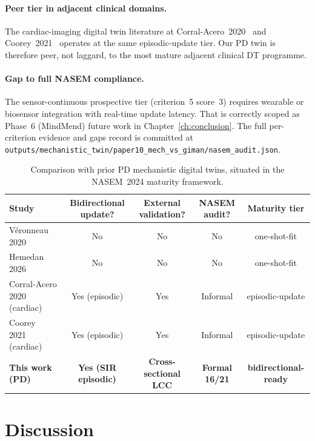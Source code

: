 \paragraph{Peer tier in adjacent clinical domains.} The cardiac-imaging digital twin literature at Corral-Acero~2020~\cite{corralacero2020cardiac} and Coorey~2021~\cite{coorey2021healthdt} operates at the same episodic-update tier. Our PD twin is therefore peer, not laggard, to the most mature adjacent clinical DT programme.

\paragraph{Gap to full NASEM compliance.} The sensor-continuous prospective tier (criterion~5 score~3) requires wearable or biosensor integration with real-time update latency. That is correctly scoped as Phase~6 (MindMend) future work in Chapter~\ref{ch:conclusion}. The full per-criterion evidence and gaps record is committed at \texttt{outputs/mechanistic\_twin/paper10\_mech\_vs\_giman/nasem\_audit.json}.

\begin{table}[H]
\centering
\caption{Comparison with prior PD mechanistic digital twins, situated in the NASEM~2024 maturity framework.}
\label{p10:tab:competitors}
\footnotesize
\begin{tabular}{@{}lcccc@{}}
\toprule
Study & Bidirectional update? & External validation? & NASEM audit? & Maturity tier \\
\midrule
V\'{e}ronneau 2020~\cite{veronneau2020}            & No             & No              & No       & one-shot-fit \\
Hemedan 2026~\cite{hemedan2026}                    & No             & No              & No       & one-shot-fit \\
Corral-Acero 2020~\cite{corralacero2020cardiac} (cardiac) & Yes (episodic) & Yes           & Informal & episodic-update \\
Coorey 2021~\cite{coorey2021healthdt} (cardiac)    & Yes (episodic) & Yes             & Informal & episodic-update \\
\textbf{This work (PD)}                             & \textbf{Yes (SIR episodic)} & \textbf{Cross-sectional LCC} & \textbf{Formal 16/21} & \textbf{bidirectional-ready} \\
\bottomrule
\end{tabular}
\end{table}

\section{Discussion}
\label{sec:p10-discussion}

